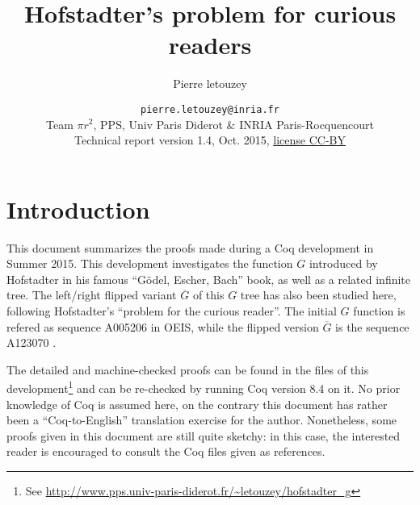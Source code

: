 \documentclass[a4paper,11pt]{article}
\title{Hofstadter's problem for curious readers}
\author{Pierre letouzey}
\date{\small
{\tt pierre.letouzey@inria.fr}\\
Team $\pi r^2$, PPS, Univ Paris Diderot \& INRIA Paris-Rocquencourt\\
Technical report version 1.4, Oct. 2015, \href{http://creativecommons.org/licenses/by/4.0/}{license CC-BY}
}
\begin{document}
\newtheorem{theorem}{Theorem}
\newtheorem{definition}{Definition}
\maketitle


\newcommand{\docgen}[2]{\href{http://www.pps.univ-paris-diderot.fr/~letouzey/hofstadter_g/doc/#1.html#2}{\tt #1.v}}
\newcommand{\doc}[1]{\docgen{#1}{}}
\newcommand{\doclab}[2]{\docgen{#1}{\##2}}
\newcommand{\FG}{\ensuremath{\overline{G}}}
\newcommand{\fibrest}{\ensuremath{\Sigma F_i}}
\newcommand{\flip}{\textit{flip}}
\newcommand{\depth}{\textit{depth}}

\section{Introduction}
This document summarizes the proofs made during a Coq development in
Summer 2015. This development investigates the function $G$ introduced
by Hofstadter in his famous ``Gödel, Escher, Bach'' book\cite{GEB},
as well as a related infinite tree. The left/right flipped variant
$\FG$ of this $G$ tree has also been studied here, following
Hofstadter's ``problem for the curious reader''.
The initial $G$ function is refered as sequence A005206 in
OEIS\cite{OEIS-G}, while the flipped version $\FG$ is the sequence
A123070 \cite{OEIS-FG}.

The detailed and machine-checked proofs can be found in the files
of this development\footnote{See
\url{http://www.pps.univ-paris-diderot.fr/~letouzey/hofstadter_g}}
and can be re-checked by running Coq \cite{Coq} version 8.4 on it.
No prior knowledge of Coq is assumed here, on the contrary this
document has rather been a ``Coq-to-English'' translation
exercise for the author. Nonetheless, some proofs given in this
document are still quite sketchy: in this case, the interested
reader is encouraged to consult the Coq files given as references.
\end{document}
